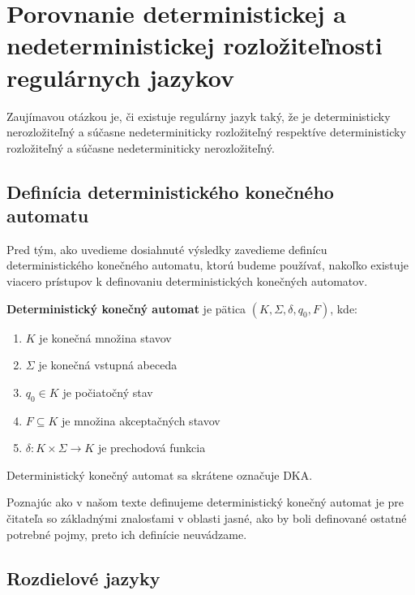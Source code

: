 \chapter[Porovnanie determinizmu a nedeterminizmu]{Porovnanie deterministickej a nedeterministickej rozložiteľnosti regulárnych jazykov}
\label{kap:det_vs_ndet}

Zaujímavou otázkou je, či existuje regulárny jazyk taký, že je deterministicky nerozložiteľný a súčasne nedeterminiticky rozložiteľný respektíve deterministicky rozložiteľný a súčasne nedeterminiticky nerozložiteľný.

\section{Definícia deterministického konečného automatu}

Pred tým, ako uvedieme dosiahnuté výsledky zavedieme definícu deterministického konečného automatu, ktorú budeme používať, nakoľko existuje viacero prístupov k definovaniu deterministických konečných automatov.

\begin{definition}
\textbf{Deterministický konečný automat} je pätica $ (K, \Sigma, \delta, q_0, F) $, kde:
\begin{enumerate}  
\item $ K $ je konečná množina stavov
\item $ \Sigma $ je konečná vstupná abeceda
\item $ q_0 \in K $ je počiatočný stav
\item $ F \subseteq K $ je množina akceptačných stavov
\item $ \delta : K \times \Sigma \rightarrow K $ je prechodová funkcia
\end{enumerate}
\end{definition}

\begin{note}
Deterministický konečný automat sa skrátene označuje DKA.
\end{note}

Poznajúc ako v našom texte definujeme deterministický konečný automat je pre čitateľa so základnými znalosťami v oblasti jasné, ako by boli definované ostatné potrebné pojmy, preto ich definície neuvádzame.

\section{Rozdielové jazyky}

